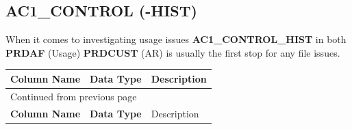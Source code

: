 \documentclass[12pt,twoside]{article}
\begin{document}
\subsection{AC1\_CONTROL (-HIST)}
\label{sec:orgheadline30}
When it comes to investigating usage issues \textbf{AC1\_CONTROL\_HIST} in both \textbf{PRDAF} (Usage) \textbf{PRDCUST} (AR) is usually the first stop for any file issues.


\footnotesize

\begin{longtable}{l|l|l}
\hline
\textbf{Column Name} & \textbf{Data Type} & Description\\
\hline
\endfirsthead
\multicolumn{3}{l}{Continued from previous page} \\
\hline

\textbf{Column Name} & \textbf{Data Type} & Description \\


\end{longtable}
\end{document}
